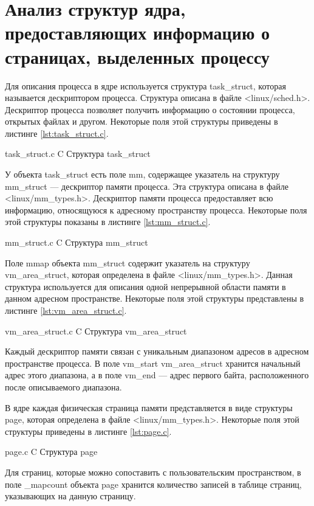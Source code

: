\section{Анализ структур ядра, предоставляющих информацию о страницах, выделенных процессу}

Для описания процесса в ядре используется структура task\_struct, которая называется дескриптором процесса. Структура описана в файле <linux/sched.h>. Дескриптор процесса позволяет получить информацию о состоянии процесса, открытых файлах и другом. Некоторые поля этой структуры приведены в листинге \ref{lst:task_struct.c}.

    {task_struct.c}
    {C}
    {Структура task\_struct}
    
У объекта task\_struct есть поле mm, содержащее указатель на структуру mm\_struct --- дескриптор памяти процесса. Эта структура описана в файле <linux/mm\_types.h>. Дескриптор памяти процесса предоставляет всю информацию, относящуюся к адресному пространству процесса. Некоторые поля этой структуры показаны в листинге \ref{lst:mm_struct.c}.

\newpage

    {mm_struct.c}
    {C}
    {Структура mm\_struct}
    
Поле mmap объекта mm\_struct содержит указатель на структуру vm\_area\_struct, которая определена в файле <linux/mm\_types.h>. Данная структура используется для описания одной непрерывной области памяти в данном адресном пространстве. Некоторые поля этой структуры представлены в листинге \ref{lst:vm_area_struct.c}.
    
    {vm_area_struct.c}
    {C}
    {Структура vm\_area\_struct}

Каждый дескриптор памяти связан с уникальным диапазоном адресов в адресном пространстве процесса. В поле vm\_start vm\_area\_struct хранится начальный адрес этого диапазона, а в поле vm\_end --- адрес первого байта, расположенного после описываемого диапазона.

В ядре каждая физическая страница памяти представляется в виде структуры page, которая определена в файле <linux/mm\_types.h>. Некоторые поля этой структуры приведены в листинге \ref{lst:page.c}.

    {page.c}
    {C}
    {Структура page}

Для страниц, которые можно сопоставить с пользовательским пространством, в поле \_mapcount объекта page хранится количество записей в таблице страниц, указывающих на данную страницу.

